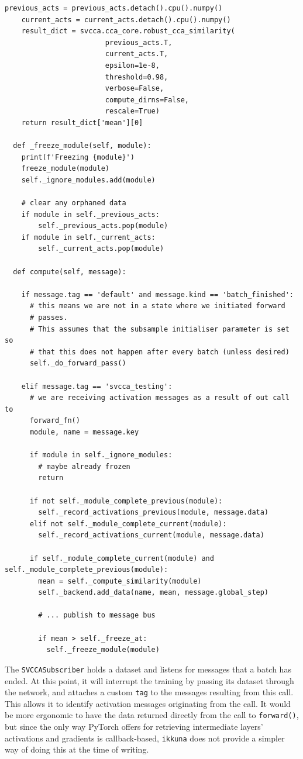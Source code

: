 \begin{lstlisting}[label={lst:svcca_sub},
caption={SVCCA Subscriber}]
    previous_acts = previous_acts.detach().cpu().numpy()
    current_acts = current_acts.detach().cpu().numpy()
    result_dict = svcca.cca_core.robust_cca_similarity(
                        previous_acts.T,
                        current_acts.T,
                        epsilon=1e-8,
                        threshold=0.98,
                        verbose=False,
                        compute_dirns=False,
                        rescale=True)
    return result_dict['mean'][0]

  def _freeze_module(self, module):
    print(f'Freezing {module}')
    freeze_module(module)
    self._ignore_modules.add(module)

    # clear any orphaned data
    if module in self._previous_acts:
        self._previous_acts.pop(module)
    if module in self._current_acts:
        self._current_acts.pop(module)

  def compute(self, message):

    if message.tag == 'default' and message.kind == 'batch_finished':
      # this means we are not in a state where we initiated forward
      # passes.
      # This assumes that the subsample initialiser parameter is set so
      # that this does not happen after every batch (unless desired)
      self._do_forward_pass()

    elif message.tag == 'svcca_testing':
      # we are receiving activation messages as a result of out call to
      forward_fn()
      module, name = message.key

      if module in self._ignore_modules:
        # maybe already frozen
        return

      if not self._module_complete_previous(module):
        self._record_activations_previous(module, message.data)
      elif not self._module_complete_current(module):
        self._record_activations_current(module, message.data)

      if self._module_complete_current(module) and self._module_complete_previous(module):
        mean = self._compute_similarity(module)
        self._backend.add_data(name, mean, message.global_step)

        # ... publish to message bus

        if mean > self._freeze_at:
          self._freeze_module(module)
\end{lstlisting}

The \texttt{SVCCASubscriber} holds a dataset and listens for messages that a
batch has ended. At this point, it will interrupt the training by passing its
dataset through the network, and attaches a custom \texttt{tag} to the messages
resulting from this call. This allows it to identify activation messages
originating from the call. It would be more ergonomic to have the data returned
directly from the call to \texttt{forward()}, but since the only way PyTorch
offers for retrieving intermediate layers' activations and gradients is
callback-based, \texttt{ikkuna} does not provide a simpler way of doing this at
the time of writing.

